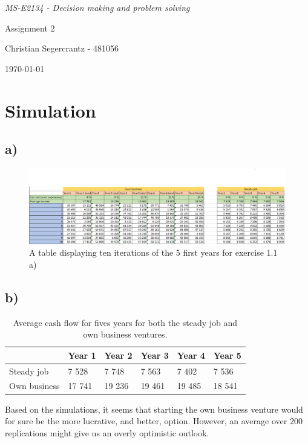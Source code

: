 \documentclass{article}
\begin{document}
	\textit{MS-E2134 - Decision making and problem solving}
	\vfill
	{\centering \Huge Assignment 2 \par}
	\vfill
	Christian Segercrantz - 481056 \\
	\par \today
	\pagebreak
	\tableofcontents
	\pagebreak
\section{Simulation}
\subsection{a)}
\begin{figure}[H]
	\includegraphics[width=\textwidth]{1a.png}
	\caption{A table displaying ten iterations of the 5 first years for exercise 1.1 a)}
	\label{fig:1a}
\end{figure}

\subsection{b)}

	\begin{table}[h]
		\centering
		\caption{Average cash flow for fives years for both the steady job and own business ventures.}
		\label{tab:1b}
		\begin{tabular}{l|l|l|l|l|l|}
			\cline{2-6}
			& Year 1 & Year 2 & Year 3 & Year 4 & Year 5 \\ \hline
			\multicolumn{1}{|l|}{Steady job}   & 7 528  & 7 748  & 7 563  & 7 402  & 7 536  \\ \hline
			\multicolumn{1}{|l|}{Own business} & 17 741 & 19 236 & 19 461 & 19 485 & 18 541 \\ \hline
		\end{tabular}
	\end{table}
	
	Based on the simulations, it seems that starting the own business venture would for sure be the more lucrative, and better, option. However, an average over 200 replications might give us an overly optimistic outlook.
\end{document}
